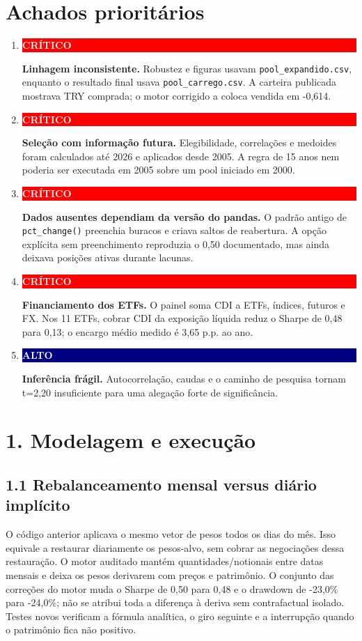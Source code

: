 \documentclass[10pt,a4paper]{article}
\newcommand{\critical}[1]{\colorbox{red}{\textcolor{white}{\strut\textbf{#1}}}}
\newcommand{\high}[1]{\colorbox{navy}{\textcolor{white}{\strut\textbf{#1}}}}
\begin{document}
\section*{Achados prioritários}
\begin{enumerate}
\item \critical{CRÍTICO} \textbf{Linhagem inconsistente.} Robustez e figuras
usavam \texttt{pool\_expandido.csv}, enquanto o resultado final usava
\texttt{pool\_carrego.csv}. A carteira publicada mostrava TRY comprada; o motor
corrigido a coloca vendida em -0,614.
\item \critical{CRÍTICO} \textbf{Seleção com informação futura.} Elegibilidade,
correlações e medoides foram calculados até 2026 e aplicados desde 2005. A regra
de 15 anos nem poderia ser executada em 2005 sobre um pool iniciado em 2000.
\item \critical{CRÍTICO} \textbf{Dados ausentes dependiam da versão do pandas.}
O padrão antigo de \texttt{pct\_change()} preenchia buracos e criava saltos de
reabertura. A opção explícita sem preenchimento reproduzia o 0,50 documentado,
mas ainda deixava posições ativas durante lacunas.
\item \critical{CRÍTICO} \textbf{Financiamento dos ETFs.} O painel soma CDI a
ETFs, índices, futuros e FX. Nos 11 ETFs, cobrar CDI da exposição líquida reduz
o Sharpe de 0,48 para 0,13; o encargo médio medido é 3,65 p.p. ao ano.
\item \high{ALTO} \textbf{Inferência frágil.} Autocorrelação, caudas e o caminho
de pesquisa tornam t=2,20 insuficiente para uma alegação forte de significância.
\end{enumerate}

\newpage
\section*{1. Modelagem e execução}

\subsection*{1.1 Rebalanceamento mensal versus diário implícito}
O código anterior aplicava o mesmo vetor de pesos todos os dias do mês. Isso
equivale a restaurar diariamente os pesos-alvo, sem cobrar as negociações dessa
restauração. O motor auditado mantém quantidades/notionais entre datas mensais e
deixa os pesos derivarem com preços e patrimônio. O conjunto das correções do
motor muda o Sharpe de 0,50 para 0,48 e o drawdown de -23,0\% para
-24,0\%; não se atribui toda a diferença à deriva sem contrafactual isolado.
Testes novos verificam a fórmula analítica, o giro seguinte e a interrupção
quando o patrimônio fica não positivo.
\end{document}
